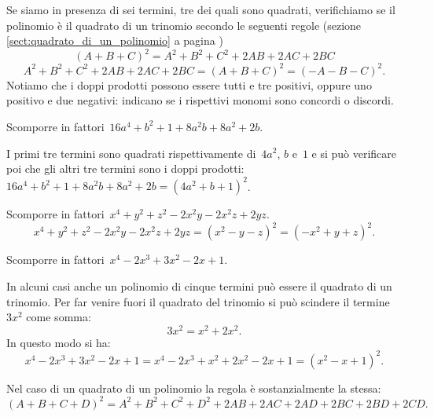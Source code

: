 Se siamo in presenza di sei termini, tre dei quali sono quadrati, verifichiamo se il polinomio è il quadrato di un
trinomio secondo le seguenti regole (sezione \ref{sect:quadrato_di_un_polinomio} a pagina \pageref{sect:quadrato_di_un_polinomio})
\begin{equation*}
(A+B+C)^{2}=A^{2}+B^{2}+C^{2}+2AB+2AC+2BC
\end{equation*}
\begin{equation*}
A^{2}+B^{2}+C^{2}+2AB+2AC+2BC=(A+B+C)^{2}=(-A-B-C)^{2}.
\end{equation*}
Notiamo che i doppi prodotti possono essere tutti e tre positivi, oppure uno positivo e due negativi:
indicano se i rispettivi monomi sono concordi o discordi.
\pagebreak
\begin{exrig}
 \begin{esempio}
Scomporre in fattori~$16a^{4}+b^{2}+1+8a^{2}b+8a^{2}+2b$.

I primi tre termini sono quadrati rispettivamente di~$4a^{2}$, $b$ e~$1$ e si può verificare poi che gli altri tre termini sono
i doppi prodotti:~$16a^{4}+b^{2}+1+8a^{2}b+8a^{2}+2b=\left(4a^{2}+b+1\right)^{2}$.
 \end{esempio}

 \begin{esempio}
Scomporre in fattori~$x^{4}+y^{2}+z^{2}-2x^{2}y-2x^{2}z+2yz$.
\[x^{4}+y^{2}+z^{2}-2x^{2}y-2x^{2}z+2yz=\left(x^{2}-y-z\right)^{2}=\left(-x^{2}+y+z\right)^{2}.\]
 \end{esempio}

 \begin{esempio}
Scomporre in fattori~$x^{4}-2x^{3}+3x^{2}-2x+1$.

In alcuni casi anche un polinomio di cinque termini può essere il quadrato di un trinomio.
Per far venire fuori il quadrato del trinomio si può scindere il termine~$3x^{2}$ come somma:
\[3x^{2}=x^{2}+2x^{2}.\]
In questo modo si ha:
\[x^{4}-2x^{3}+3x^{2}-2x+1=x^{4}-2x^{3}+x^{2}+2x^{2}-2x+1=(x^{2}-x+1)^{2}.\]
 \end{esempio}
\end{exrig}

Nel caso di un quadrato di un polinomio la regola è sostanzialmente la stessa:
\begin{equation*}
(A+B+C+D)^{2}=A^{2}+B^{2}+C^{2}+D^{2}+2AB+2AC+2AD+2BC+2BD+2CD.
\end{equation*}
\ovalbox{\risolvii \ref{ese:13.33},\ref{ese:13.34},\ref{ese:13.35}, \ref{ese:13.36}, \ref{ese:13.37}}

